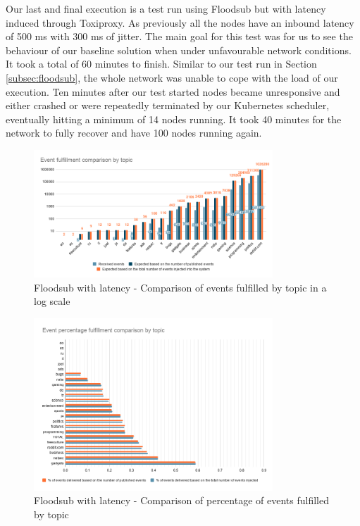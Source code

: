 Our last and final execution is a test run using Floodsub but with latency
induced through Toxiproxy. As previously all the nodes have an inbound latency
of 500 ms with 300 ms of jitter. The main goal for this test was for us to see
the behaviour of our baseline solution when under unfavourable network
conditions. It took a total of 60 minutes to finish. Similar to our test run in
Section \ref{subsec:floodsub}, the whole network was unable to cope with the
load of our execution. Ten minutes after our test started nodes became
unresponsive and either crashed or were repeatedly terminated by our Kubernetes
scheduler, eventually hitting a minimum of 14 nodes running. It took 40 minutes
for the network to fully recover and have 100 nodes running again.

\begin{figure}[!htb]
  \centering
  \includegraphics[width=0.8\textwidth]{../images/graph-floodsub-latency-event-fulfillment-comparison.png}
  \caption{Floodsub with latency - Comparison of events fulfilled by topic in a log scale}
  \label{fig:graph-floodsub-latency-event-fulfillment-comparison}
\end{figure}

\begin{figure}[!htb]
  \centering
  \includegraphics[width=0.8\textwidth]{../images/graph-floodsub-latency-event-percentage-fulfillment-comparison.png}
  \caption{Floodsub with latency - Comparison of percentage of events fulfilled by topic}
  \label{fig:graph-floodsub-latency-event-percentage-fulfillment-comparison}
\end{figure}

